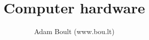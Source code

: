 \documentclass[oneside]{book}
\begin{document}
\author{Adam Boult (www.bou.lt)}
\title{Computer hardware}
\maketitle

\setcounter{tocdepth}{0}
\tableofcontents


\end{document}
